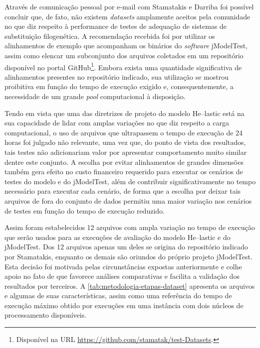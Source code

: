 \documentclass[english,brazilian]{UNISINOSmonografia} %
\begin{document}
Através de comunicação pessoal por e-mail com Stamatakis e Darriba foi possível concluir que, de fato, não existem \textit{datasets} amplamente aceitos pela comunidade no que diz respeito à performance de testes de adequação de sistemas de substituição filogenética.
A recomendação recebida foi por utilizar os alinhamentos de exemplo que acompanham os binários do \textit{software} jModelTest, assim como elencar um subconjunto dos arquivos coletados em um repositório disponível no portal GitHub\footnote{
	Disponível na URL \url{https://github.com/stamatak/test-Datasets}.
}.
Embora exista uma quantidade significativa de alinhamentos presentes no repositório indicado, sua utilização se mostrou proibitiva em função do tempo de execução exigido e, consequentemente, a necessidade de um grande \textit{pool} computacional à disposição.


Tendo em vista que uma das diretrizes de projeto do modelo \textsf{He}--lastic está na sua capacidade de lidar com amplas variações no que diz respeito a carga computacional, o uso de arquivos que ultrapassem o tempo de execução de 24 horas foi julgado não relevante, uma vez que, do ponto de vista dos resultados, tais testes não adicionariam valor por apresentar comportamento muito similar dentre este conjunto.
A escolha por evitar alinhamentos de grandes dimensões também gera efeito no custo financeiro requerido para executar os cenários de testes do modelo e do jModelTest, além de contribuir significativamente no tempo necessário para executar cada cenário, de forma que a escolha por deixar tais arquivos de fora do conjunto de dados permitiu uma maior variação nos cenários de testes em função do tempo de execução reduzido.


Assim foram estabelecidos 12 arquivos com ampla variação no tempo de execução que serão usados para as execuções de avaliação do modelo \textsf{He}--lastic e do jModelTest.
Dos 12 arquivos apenas um deles se origina do repositório indicado por Stamatakis, enquanto os demais são oriundos do próprio projeto jModelTest.
Esta decisão foi motivada pelas circunstâncias expostas anteriormente e colhe apoio no fato de que favorece análises comparativas e facilita a validação dos resultados por terceiros.
A \autoref{tab:metodologia-etapas-dataset} apresenta os arquivos e algumas de suas características, assim como uma referência do tempo de execução máximo obtido por execuções em uma instância com dois núcleos de processamento disponíveis.
\end{document}
